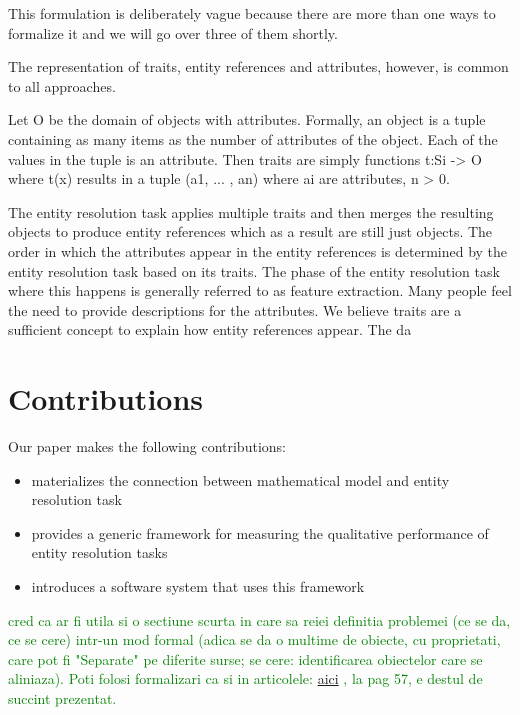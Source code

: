 \documentclass[11pt]{article}
\begin{document}
    This formulation is deliberately vague because there are more than one ways
    to formalize it and we will go over three of them shortly.
    
    The representation of traits, entity references and attributes, however, is
    common to all approaches.

    Let O be the domain of objects with attributes.
    Formally, an object is a tuple containing as many items as the number of
    attributes of the object.
    Each of the values in the tuple is an attribute.
    Then traits are simply functions t:Si -> O where t(x) results in a tuple
    (a1, ... , an) where ai are attributes, n > 0.
    
    The entity resolution task applies multiple traits and then merges the
    resulting objects to produce entity references which as a result are still
    just objects.
    The order in which the attributes appear in the entity references
    is determined by the entity resolution task based on its traits.
    The phase of the entity resolution task where this happens is generally
    referred to as feature extraction.
    Many people feel the need to provide descriptions for the attributes.
    We believe traits are a sufficient concept to explain how entity references
    appear.
    The da


    \section{Contributions}\label{sec:contributions}

    Our paper makes the following contributions:

    \begin{itemize}
        \item materializes the connection between mathematical model and entity
        resolution task
        \item provides a generic framework for measuring the qualitative
        performance of entity resolution tasks
        \item introduces a software system that uses this framework
    \end{itemize}
    
    \textcolor{green}{cred ca ar fi utila si o sectiune scurta in care sa reiei definitia problemei (ce se da, ce se
    cere) intr-un mod formal (adica se da o multime de obiecte, cu proprietati, care pot fi "Separate" pe diferite
    surse; se cere: identificarea obiectelor care se aliniaza). Poti folosi formalizari ca si in articolele:}
    \href{https://d1wqtxts1xzle7.cloudfront.net/30672623/A11SEP-CD-libre.pdf?1391815744=&response-content-disposition=inline%3B+filename%3DA_Uniform_Dependency_Language_for_Improv.pdf&Expires=1693931642&Signature=G-sCf5o-XZNgP~WX0yxCtzzbvCqj4~Tu4dka6QLKrOk6zPZ5XTrOZD5kqcQxJJa48w5-2Ya31rd4b~BV1bR5kJMwuFcsGzAPcQqDhpRhVxoki41kZUSYU73pVTcfyqeE3l7gTg6Qriuowj8xM3LgHfHUft80iguUhSMUDmC2FLg7WGjHWETeKquMv51t9sKpyIQHG11wggW2XMkcx1tygkd92b339bqEX-urQhQN9irKBou-dmrJvF2O7qb2LxZsb4fwYLvwi0vOZ6fzVguOdsRIcqm6uzdmQn3tPV1oMpcx4Qy6q-dUWNm4uzJZ9PbzW5Wo351FXZVogeepZGXFcw__&Key-Pair-Id=APKAJLOHF5GGSLRBV4ZA#page=53}{aici}
    \textcolor{green}{, la pag 57, e destul de succint prezentat.}
\end{document}
